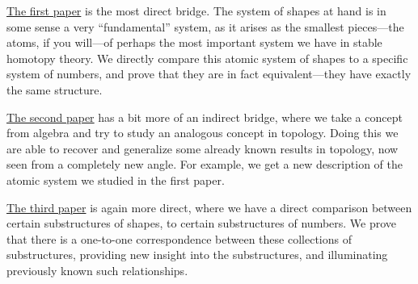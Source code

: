 {\hyperref[ch1]{The first paper}} is the most direct bridge. The system of shapes at hand is in some sense a very ``fundamental'' system, as it arises as the smallest pieces---the atoms, if you will---of perhaps the most important system we have in stable homotopy theory. We directly compare this atomic system of shapes to a specific system of numbers, and prove that they are in fact equivalent---they have exactly the same structure. 

{\hyperref[ch2]{The second paper}} has a bit more of an indirect bridge, where we take a concept from algebra and try to study an analogous concept in topology. Doing this we are able to recover and generalize some already known results in topology, now seen from a completely new angle. For example, we get a new description of the atomic system we studied in the first paper. 

{\hyperref[ch3]{The third paper}} is again more direct, where we have a direct comparison between certain substructures of shapes, to certain substructures of numbers. We prove that there is a one-to-one correspondence between these collections of substructures, providing new insight into the substructures, and illuminating previously known such relationships. 
  